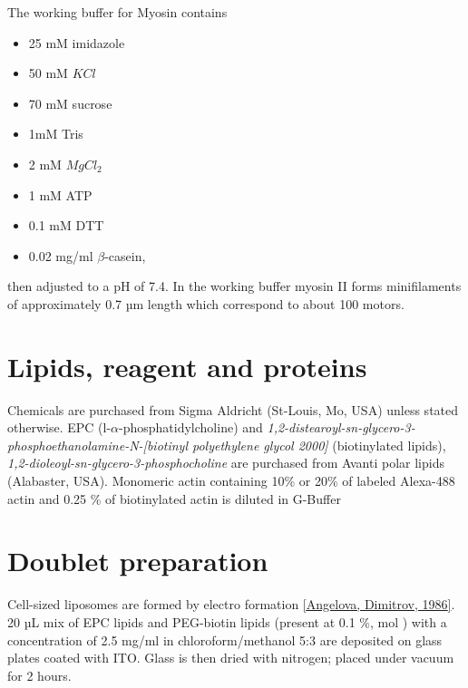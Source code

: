 \documentclass[A4paperpaper,11pt,english]{sphinxmanual}
\begin{document}
The working buffer for Myosin contains
\begin{itemize}
\item {} 
25 mM imidazole

\item {} 
50 mM \(KCl\)

\item {} 
70 mM sucrose

\item {} 
1mM Tris

\item {} 
2 mM \(MgCl_2\)

\item {} 
1 mM ATP

\item {} 
0.1 mM DTT

\item {} 
0.02 mg/ml \(\beta\)-casein,

\end{itemize}

then adjusted to a pH  of 7.4.
In the working buffer myosin II
forms minifilaments of approximately 0.7 µm length which correspond to about 100
motors.


\section{Lipids, reagent and proteins}
\label{index-latex:lipids-reagent-and-proteins}
Chemicals are purchased from Sigma Aldricht (St-Louis, Mo, USA) unless stated otherwise.
EPC (l-\(\alpha\)-phosphatidylcholine) and \emph{1,2-distearoyl-sn-glycero-3-phosphoethanolamine-N-{[}biotinyl polyethylene glycol 2000{]}}
(biotinylated lipids), \emph{1,2-dioleoyl-sn-glycero-3-phosphocholine} are purchased from Avanti polar lipids (Alabaster, USA).
Monomeric actin containing 10\% or 20\% of labeled Alexa-488
actin and 0.25 \% of biotinylated actin is diluted in G-Buffer


\section{Doublet preparation}
\label{index-latex:electroformation}\label{index-latex:doublet-preparation}
Cell-sized liposomes are formed by electro formation {\hyperref[index-latex:angelova1986]{{[}Angelova, Dimitrov,  1986{]}}}.
20 µL mix of EPC lipids and PEG-biotin lipids (present at 0.1 \%, mol ) with a
concentration of 2.5 mg/ml in chloroform/methanol 5:3 are deposited on glass
plates coated with  ITO. Glass is then dried with  nitrogen; placed
under vacuum for 2 hours.
\end{document}
